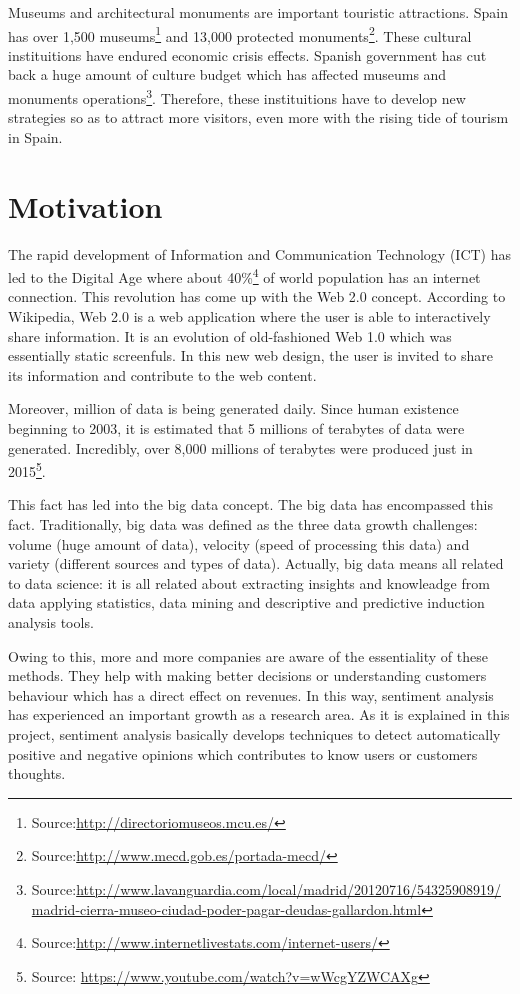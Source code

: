 \documentclass[a4paper,10pt]{book}
\begin{document}
Museums and architectural monuments are important touristic attractions. Spain has over 1,500 museums\footnote{Source:\url{http://directoriomuseos.mcu.es/}} and 13,000 protected monuments\footnote{Source:\url{http://www.mecd.gob.es/portada-mecd/}}. These cultural instituitions have endured economic crisis effects. Spanish government has cut back a huge amount of culture budget which has affected museums and monuments operations\footnote{Source:\url{http://www.lavanguardia.com/local/madrid/20120716/54325908919/madrid-cierra-museo-ciudad-poder-pagar-deudas-gallardon.html}}. Therefore, these instituitions have to develop new strategies so as to attract more visitors, even more with the rising tide of tourism in Spain.
   
  
  \section{Motivation} \label{sec:motivation}
  
The rapid development of Information and Communication Technology (ICT) has led to the Digital Age where
about 40\%\footnote{Source:\url{http://www.internetlivestats.com/internet-users/}} of world population has an internet connection. This revolution has come up with the Web 2.0 concept. According to Wikipedia, Web 2.0 is a web application where the user is able to interactively share information. It is an evolution of old-fashioned Web 1.0 which was essentially static screenfuls. In this new web design, the user is invited to share its information and contribute to the web content.     
  
Moreover, million of data is being generated daily. Since human existence beginning to 2003, it is estimated that 5 millions of terabytes of data were generated. Incredibly, over 8,000 millions of terabytes were produced just in 2015\footnote{Source: \url{https://www.youtube.com/watch?v=wWcgYZWCAXg}}.

This fact has led into the big data concept. The big data has encompassed this fact. Traditionally, big data was defined as the three data growth challenges: volume (huge amount of data), velocity (speed of processing this data) and variety (different sources and types of data). Actually, big data means all related to data science: it is all related about extracting insights and knowleadge from data applying statistics, data mining and descriptive and predictive induction analysis tools.

Owing to this, more and more companies are aware of the essentiality of these methods. They help with making better decisions or understanding customers behaviour which has a direct effect on revenues. In this way, sentiment analysis has experienced an important growth as a research area. As it is explained in this project, sentiment analysis basically develops techniques to detect automatically positive and negative opinions which contributes to know users or customers thoughts. 
\end{document}
